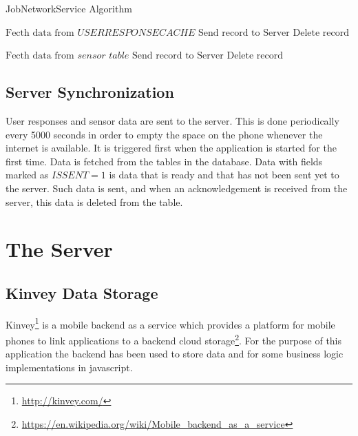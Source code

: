\begin{algorithm}
\caption{JobNetworkService Algorithm}\label{nextday}
\begin{algorithmic}[1]
\State $ \text{Fecth data from } \textit{USERRESPONSECACHE}$
  \State $\text{Send record to Server}$
  \State $\text{Delete record}$  
  \EndIf
  \EndIf
 	\EndFor

 	 \State $ \text{Fecth data from } \textit{sensor table}$
  \State $\text{Send record to Server}$
  \State $\text{Delete record}$  
  \EndIf
  \EndIf
 	\EndFor
	
 	\EndFor
\EndProcedure
\end{algorithmic}
\end{algorithm}


\subsection{Server Synchronization} \label{job}

User responses and sensor data are sent to the server. This is done periodically every 5000 seconds in order to empty the space on the phone whenever the internet is available. It is triggered first when the application is started for the first time. Data is fetched from the tables in the database. Data with fields marked as $\textit{ISSENT}=1$ is data that is ready and that has not been sent yet to the server. Such data is sent, and when an acknowledgement is received from the server, this data is deleted from the table.

\section{The Server}

\subsection{Kinvey Data Storage}

Kinvey\footnote{\url{http://kinvey.com/}} is a mobile backend as a service which provides a platform for mobile phones to link applications to a backend cloud storage\footnote{\url{https://en.wikipedia.org/wiki/Mobile_backend_as_a_service}}. For the purpose of this application the backend has been used to store data and for some business logic implementations in javascript.

